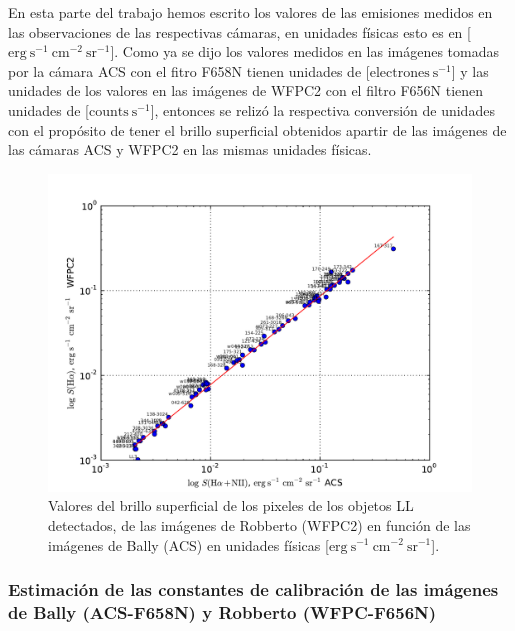 \documentclass{article}
\begin{document}
En esta parte del trabajo hemos escrito los valores de las emisiones medidos en las observaciones de las respectivas cámaras, en unidades físicas esto es en [\(\mathrm{erg\ s^{-1}\ cm^{-2}\ sr^{-1}}\)]. Como ya se dijo los valores medidos en las imágenes tomadas por la cámara ACS con el fitro F658N tienen unidades de [\(\mathrm{electrones\ s^{-1}}\)] y las unidades de los valores en las imágenes de WFPC2 con el filtro F656N tienen unidades de [\(\text{counts}\ \text{s}^{-1}\)], entonces se relizó la respectiva conversión de unidades con el propósito de tener el brillo superficial obtenidos apartir de las imágenes de las cámaras ACS y WFPC2 en las mismas unidades físicas.\\

\begin{figure}
  \centering
   \includegraphics[width=\linewidth]{luis-programas/S(alpha)_bg_WFPC2_ACS_calibrationlogT.pdf}
  \caption{Valores del brillo superficial de los pixeles de los objetos LL detectados, de las imágenes de Robberto (WFPC2) en función de las imágenes de Bally (ACS) en unidades físicas  [\(\mathrm{erg\ s^{-1}\ cm^{-2}\ sr^{-1}}\)].}
  \label{fig:brillo-fisica}
\end{figure}


\subsubsection{Estimación de las constantes de calibración de las imágenes de Bally (ACS-F658N) y Robberto (WFPC-F656N)}
\label{sec:acs}
\end{document}
